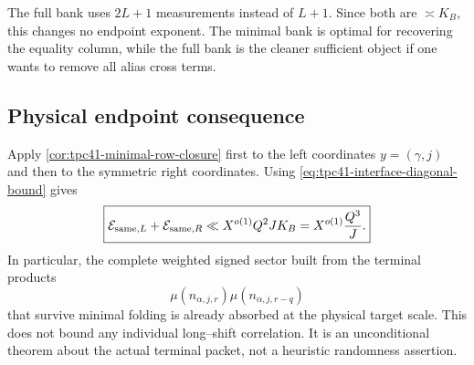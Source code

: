 The full bank uses \(2L+1\) measurements instead of \(L+1\).  Since both
are \(\asymp K_B\), this changes no endpoint exponent.  The minimal bank
is optimal for recovering the equality column, while the full bank is the
cleaner sufficient object if one wants to remove all alias cross terms.

\subsection{Physical endpoint consequence}

Apply \cref{cor:tpc41-minimal-row-closure} first to the left coordinates
\(y=(\gamma,j)\) and then to the symmetric right coordinates.  Using
\eqref{eq:tpc41-interface-diagonal-bound} gives
\begin{equation}
 \boxed{
 \mathcal E_{{\rm same},L}+\mathcal E_{{\rm same},R}
 \ll X^{o(1)}Q^2JK_B
 =X^{o(1)}\frac{Q^3}{J}.}
 \label{eq:tpc41-physical-same-row-closed}
\end{equation}
In particular, the complete weighted signed sector built from the terminal
products
\begin{equation}
 \mu(n_{\alpha,j,r})\mu(n_{\alpha,j,r-q})
 \label{eq:tpc41-physical-two-mobius}
\end{equation}
that survive minimal folding is already absorbed at the physical target
scale.  This does not bound any individual long--shift correlation.  It is
an unconditional theorem about the actual terminal packet, not a
heuristic randomness assertion.
